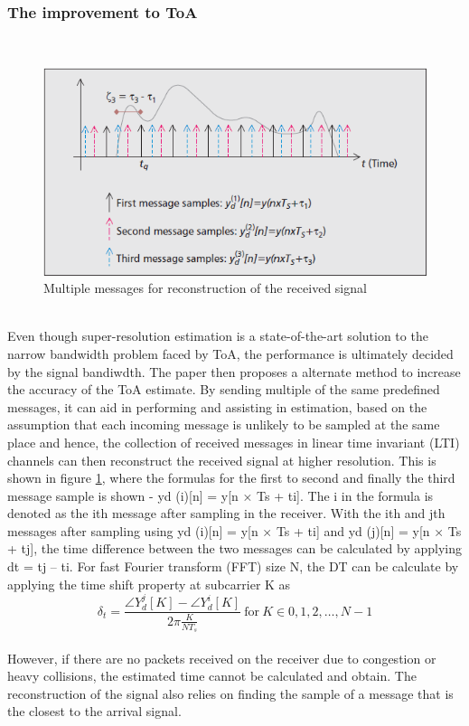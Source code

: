 \documentclass{l4proj}
\begin{document}
\subsubsection{The improvement to ToA}~\\
\FloatBarrier
\begin{figure}[h]
    \centering
    \includegraphics[width=\textwidth]{images/reconstruct}
    \caption{Multiple messages for reconstruction of the received signal}
    \label{fig:recon1}
\end{figure}\\
Even though super-resolution estimation is a state-of-the-art solution to the narrow bandwidth problem faced by ToA, the performance is ultimately decided by the signal bandiwdth. The paper then proposes a alternate method to increase the accuracy of the ToA estimate. By sending multiple of the same predefined messages, it can aid in performing and assisting in estimation, based on the assumption that each incoming message is unlikely to be sampled at the same place and hence, the collection of received messages in linear time invariant (LTI) channels can then reconstruct the received signal at higher resolution. This is shown in figure \ref{fig:recon1}, where the formulas for the first to second and finally the third message sample is shown - yd (i)[n] = y[n × Ts + ti]. The i in the formula is denoted as the ith message after sampling in the receiver. With the ith and jth messages after sampling using yd (i)[n] = y[n × Ts + ti] and yd (j)[n] = y[n × Ts + tj], the time difference between the two messages can be calculated by applying dt = tj – ti. For fast Fourier transform (FFT) size N, the DT can be calculate by applying the time shift property at subcarrier K as \\
\begin{equation*} \delta_{t}=\frac{\angle Y_{d}^{j}[K]-\angle Y_{d}^{i}[K]}{2\pi\frac{K}{NT_{s}}}\ \text{for}\ K\in 0,1,2,\ldots, N-1\tag{1} \end{equation*}\\
 However, if there are no packets received on the receiver due to congestion or heavy collisions, the estimated time cannot be calculated and obtain. The reconstruction of the signal also relies on finding the sample of a message that is the closest to the arrival signal.\cite{improvetoa}\\
\end{document}
